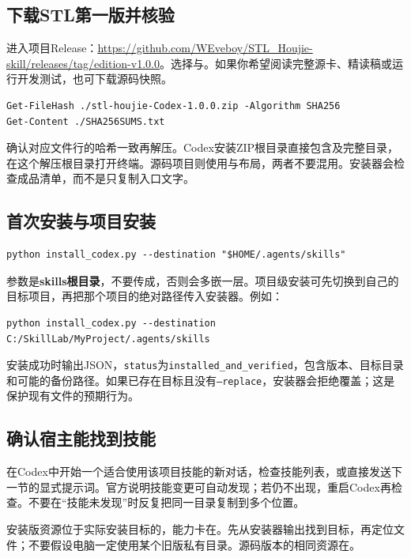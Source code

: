 \documentclass[11pt,a4paper,fontset=fandol]{ctexart}
\begin{document}
\subsection{下载STL第一版并核验}
进入项目Release：\url{https://github.com/WEveboy/STL_Houjie-skill/releases/tag/edition-v1.0.0}。选择与。如果你希望阅读完整源卡、精读稿或运行开发测试，也可下载源码快照。
\begin{lstlisting}
Get-FileHash ./stl-houjie-Codex-1.0.0.zip -Algorithm SHA256
Get-Content ./SHA256SUMS.txt
\end{lstlisting}
确认对应文件行的哈希一致再解压。Codex安装ZIP根目录直接包含及完整目录，在这个解压根目录打开终端。源码项目则使用与布局，两者不要混用。安装器会检查成品清单，而不是只复制入口文字。

\subsection{首次安装与项目安装}
\begin{lstlisting}
python install_codex.py --destination "$HOME/.agents/skills"
\end{lstlisting}
参数是\textbf{skills根目录}，不要传成，否则会多嵌一层。项目级安装可先切换到自己的目标项目，再把那个项目的绝对路径传入安装器。例如：
\begin{lstlisting}
python install_codex.py --destination C:/SkillLab/MyProject/.agents/skills
\end{lstlisting}
安装成功时输出JSON，\texttt{status}为\texttt{installed\_and\_verified}，包含版本、目标目录和可能的备份路径。如果已存在目标且没有\texttt{--replace}，安装器会拒绝覆盖；这是保护现有文件的预期行为。

\subsection{确认宿主能找到技能}
在Codex中开始一个适合使用该项目技能的新对话，检查技能列表，或直接发送下一节的显式提示词。官方说明技能变更可自动发现；若仍不出现，重启Codex再检查。不要在“技能未发现”时反复把同一目录复制到多个位置。

安装版资源位于实际安装目标的，能力卡在。先从安装器输出找到目标，再定位文件；不要假设电脑一定使用某个旧版私有目录。源码版本的相同资源在。
\end{document}
